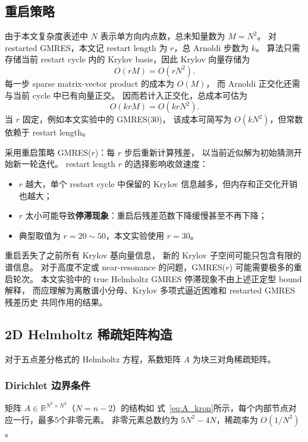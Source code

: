 \subsection{重启策略}

由于本文复杂度表述中 $N$ 表示单方向内点数，总未知量数为 $M=N^2$。
对 restarted GMRES，本文记 restart length 为 $r$，总 Arnoldi 步数为 $k$。
算法只需存储当前 restart cycle 内的 Krylov basis，因此 Krylov 向量存储为
\[
  O(rM)=O(rN^2).
\]
每一步 sparse matrix-vector product 的成本为 $O(M)$，
而 Arnoldi 正交化还需与当前 cycle 中已有向量正交。
因而若计入正交化，总成本可估为
\[
  O(krM)=O(krN^2).
\]
当 $r$ 固定，例如本文实验中的 GMRES(30)，
该成本可简写为 $O(kN^2)$，但常数依赖于 restart length。

采用重启策略 GMRES($r$)：每 $r$ 步后重新计算残差，
以当前近似解为初始猜测开始新一轮迭代。
restart length $r$ 的选择影响收敛速度：
\begin{itemize}[itemsep=2pt]
  \item $r$ 越大，单个 restart cycle 中保留的 Krylov 信息越多，但内存和正交化开销也越大；
  \item $r$ 太小可能导致\textbf{停滞现象}：重启后残差范数下降缓慢甚至不再下降；
  \item 典型取值为 $r = 20 \sim 50$，本文实验使用 $r=30$。
\end{itemize}

\begin{remark}[重启的代价]
  重启丢失了之前所有 Krylov 基向量信息，
  新的 Krylov 子空间可能只包含有限的谱信息。
  对于高度不定或 near-resonance 的问题，GMRES($r$) 可能需要极多的重启轮次。
  本文实验中的 true Helmholtz GMRES 停滞现象不由上述正定型 bound 解释，
  而应理解为离散谱小分母、Krylov 多项式逼近困难和 restarted GMRES 残差历史
  共同作用的结果。
\end{remark}

\subsection{2D Helmholtz 稀疏矩阵构造}

对于五点差分格式的 Helmholtz 方程，系数矩阵 $A$ 为块三对角稀疏矩阵。

\subsubsection{Dirichlet 边界条件}

矩阵 $A \in \mathbb{R}^{N^2 \times N^2}$（$N = n-2$）的结构如
式~\eqref{eq:A_kron}所示，每个内部节点对应一行，最多5个非零元素。
非零元素总数约为 $5N^2 - 4N$，稀疏率为 $O(1/N^2)$。

